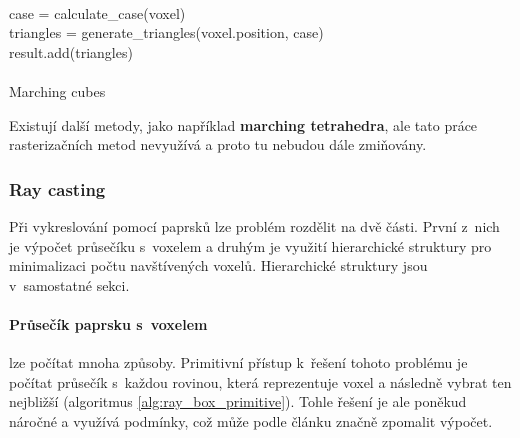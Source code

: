 \begin{center}
	\begin{czechalgorithm}[H] \label{alg:marching_cubes}
		 {\\
			case = calculate\_case(voxel)\\
			triangles = generate\_triangles(voxel.position, case)\\
			result.add(triangles)\\
		}\\
		\caption{Marching cubes}
	\end{czechalgorithm}
\end{center}

Existují další metody, jako například \textbf{marching tetrahedra}, ale tato práce rasterizačních metod nevyužívá a proto tu nebudou dále zmiňovány.

\subsubsection{Ray casting} \label{sec:voxel_intersection}
Při vykreslování pomocí paprsků lze problém rozdělit na dvě části. První z~nich je výpočet průsečíku s~voxelem a druhým je využití hierarchické struktury pro minimalizaci počtu navštívených voxelů. Hierarchické struktury jsou v~samostatné sekci.

\paragraph{Průsečík paprsku s~voxelem} lze počítat mnoha způsoby. Primitivní přístup k~řešení tohoto problému je počítat průsečík s~každou rovinou, která reprezentuje voxel a následně vybrat ten nejbližší (algoritmus \ref{alg:ray_box_primitive}). Tohle řešení je ale poněkud náročné a využívá podmínky, což může podle článku \cite{gpu_branch} značně zpomalit výpočet.

